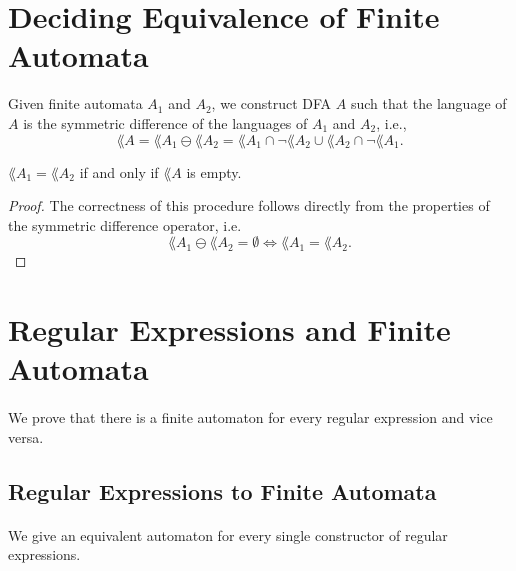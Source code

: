 \documentclass[11pt,a4paper,oneside]{book}
\begin{document}

        \section{Deciding Equivalence of Finite Automata}
            Given finite automata $A_1$ and $A_2$, we construct DFA $A$ such that the language of $A$ is the symmetric difference of the languages of $A_1$ and $A_2$, i.e.,
            \[ 
                \lang{A} = \lang{A_1} \ominus \lang{A_2} = \lang{A_1} \cap \neg \lang{A_2} \cup \lang{A_2} \cap \neg \lang{A_1}.
            \]
            \begin{theorem}
                $\lang{A_1} = \lang{A_2}$ if and only if $\lang{A}$ is empty. 
            \end{theorem}
            \begin{proof}
                The correctness of this procedure follows directly from the properties of the symmetric difference operator, i.e.
                \[ 
                    \lang{A_1} \ominus \lang{A_2} = \emptyset \Leftrightarrow \lang{A_1} = \lang{A_2}.
                \]
            \end{proof}

            
        \section{Regular Expressions and Finite Automata}

            \paragraph{} 
                We prove that there is a finite automaton for every regular expression and vice versa. 

            \subsection{Regular Expressions to Finite Automata}

                \paragraph{} 
                    We give an equivalent automaton for every single constructor of regular expressions.

\end{document}
